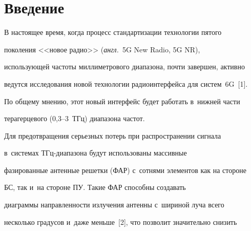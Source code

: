    

















 \thispagestyle{headings}


 




  


\section{Введение}


  


  В настоящее время, когда процесс стандартизации технологии пятого 


поколения <<новое радио>> (\textit{англ.}\ 5G New Radio, 5G NR), 


использующей час\-то\-ты мил\-ли\-мет\-ро\-во\-го диапазона, почти завершен, активно 


ведутся исследования новой технологии радиоинтерфейса для сис\-тем~6G~[1]. 


По общему мнению, этот новый интерфейс будет работать в~ниж\-ней час\-ти 


терагерцевого (0,3--3~ТГц) диапазона час\-тот. 


  


  Для предотвращения серьезных потерь при распространении сигнала  


в~сис\-те\-мах ТГц-диапазона будут использованы массивные 


фазированные антенные решетки (ФАР) с~сот\-ня\-ми элементов как на стороне 


БС, так и~на стороне ПУ. Такие ФАР способны создавать 


диаграммы направленности излучения антенны с~шириной луча всего 


несколько градусов и~даже меньше~[2], что позволит значительно снизить 


